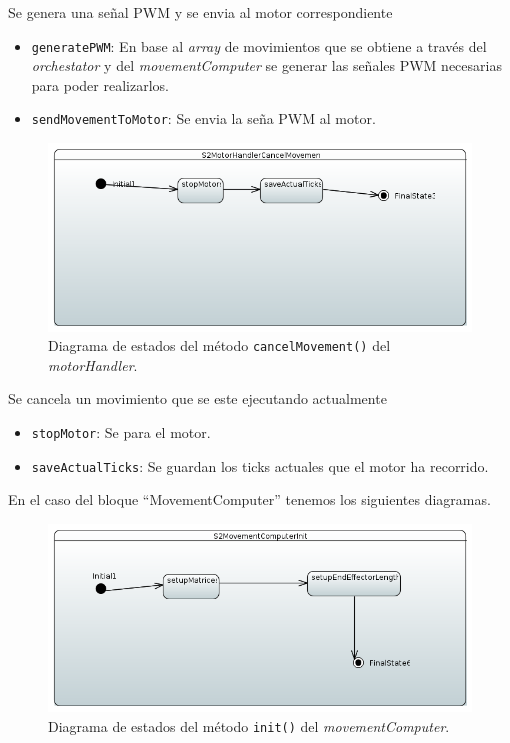 Se genera una señal PWM y se envia al motor correspondiente

\begin{itemize}
    \item \texttt{generatePWM}: En base al \textit{array} de movimientos que se obtiene a través del \textit{orchestator} y del \textit{movementComputer} se generar las señales PWM necesarias para poder realizarlos.
    
    \item \texttt{sendMovementToMotor}: Se envia la seña PWM al motor.

\end{itemize}

\begin{figure}[H]
    \centering
    \includegraphics[width=1\linewidth]{pictures/S2MotorHandlerCancelMovement.PNG}
    \caption{Diagrama de estados del método \texttt{cancelMovement()} del \textit{motorHandler}.}
    \label{fig:fun_cancel_movement_motor_handler}
\end{figure}

Se cancela un movimiento que se este ejecutando actualmente

\begin{itemize}
    \item \texttt{stopMotor}: Se para el motor.
    \item \texttt{saveActualTicks}: Se guardan los ticks actuales que el motor ha recorrido.

\end{itemize}

En el caso del bloque “MovementComputer” tenemos los siguientes diagramas.

\begin{figure}[H]
    \centering
    \includegraphics[width=1\linewidth]{pictures/S2MovementComputerInit.PNG}
    \caption{Diagrama de estados del método \texttt{init()} del \textit{movementComputer}.}
    \label{fig:fun_init_movement_computer}
\end{figure}

